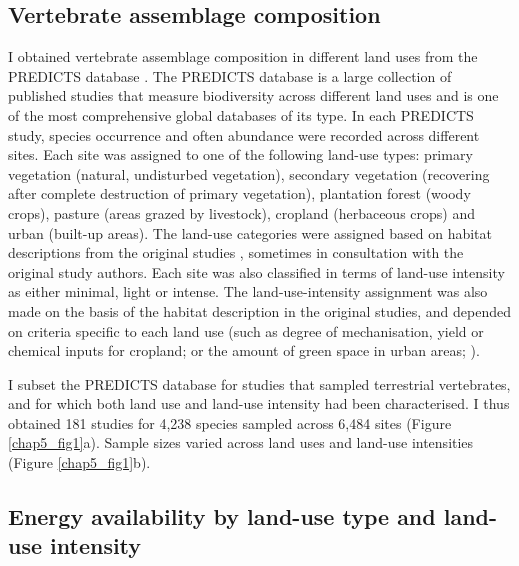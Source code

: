 \subsection{Vertebrate assemblage composition }

I obtained vertebrate assemblage composition in different land uses from the PREDICTS database \citep{Hudson2014, Hudson2017}. The PREDICTS database is a large collection of published studies that measure biodiversity across different land uses and is one of the most comprehensive global databases of its type. In each PREDICTS study, species occurrence and often abundance were recorded across different sites. Each site was assigned to one of the following land-use types: primary vegetation (natural, undisturbed vegetation), secondary vegetation (recovering after complete destruction of primary vegetation), plantation forest (woody crops), pasture (areas grazed by livestock), cropland (herbaceous crops) and urban (built-up areas). The land-use categories were assigned based on habitat descriptions from the original studies \citep{Hudson2014}, sometimes in consultation with the original study authors. Each site was also classified in terms of land-use intensity as either minimal, light or intense. The land-use-intensity assignment was also made on the basis of the habitat description in the original studies, and depended on criteria specific to each land use (such as degree of mechanisation, yield or chemical inputs for cropland; or the amount of green space in urban areas; \citet{Hudson2014}).  

I subset the PREDICTS database for studies that sampled terrestrial vertebrates, and for which both land use and land-use intensity had been characterised. I thus obtained 181 studies for 4,238 species sampled across 6,484 sites (Figure \ref{chap5_fig1}a). Sample sizes varied across land uses and land-use intensities (Figure \ref{chap5_fig1}b). 

\subsection{Energy availability by land-use type and land-use intensity}

